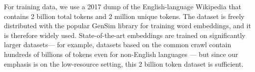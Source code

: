 \documentclass[11pt,a4paper]{article}
\begin{document}
For training data, we use a 2017 dump of the English-language Wikipedia 
that contains 2 billion total tokens and 2 million unique tokens.
The dataset is freely distributed with the popular GenSim library \cite{rehurek_lrec} for training word embeddings,
and it is therefore widely used.
State-of-the-art embeddings are trained on significantly larger datasets---%
for example, datasets based on the common crawl contain hundreds of billions of tokens even for non-English languages \cite{buck2014n,grave2018learning}---%
but since our emphasis is on the low-resource setting,
this 2 billion token dataset is sufficient.

\begin{figure}
\centering

\end{figure}
\end{document}
